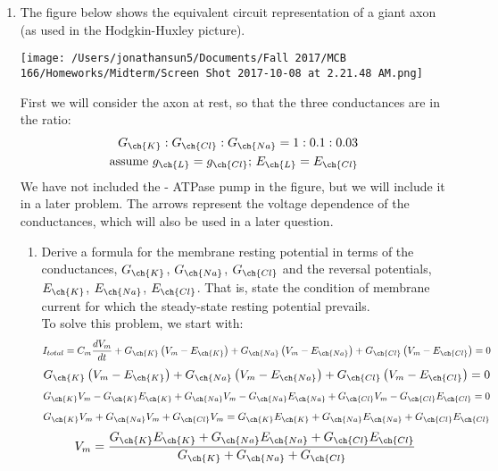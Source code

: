 \documentclass[11pt]{article}
\begin{document}
\begin{enumerate}[label=\arabic*.]
\newpage
\item
The figure below shows the equivalent circuit representation of a giant axon (as used in the Hodgkin-Huxley picture).
\begin{center}
\texttt{[image: /Users/jonathansun5/Documents/Fall 2017/MCB 166/Homeworks/Midterm/Screen Shot 2017-10-08 at 2.21.48 AM.png]}
\end{center}
First we will consider the axon at rest, so that the three conductances are
in the ratio:
\begin{align*}
G_{\ch{K}} : G_{\ch{Cl}} : G_{\ch{Na}} = 1 : 0.1 : 0.03 \\
\text{assume } g_{\ch{L}} = g_{\ch{Cl}}\text{; } E_{\ch{L}} = E_{\ch{Cl}}
\end{align*}
We have not included the - ATPase pump in the figure, but we will include it in a later problem. The arrows represent the voltage dependence of the conductances, which will also be used in a later question.
\begin{enumerate}[label=\alph*.]
\item
Derive a formula for the membrane resting potential in terms of the conductances, $G_{\ch{K}}$, $G_{\ch{Na}}$, $G_{\ch{Cl}}$ and the reversal potentials, $E_{\ch{K}}$, $E_{\ch{Na}}$, $E_{\ch{Cl}}$. That is, state the condition of membrane current for which the steady-state resting potential prevails.
\vspace*{1\baselineskip}
\\
To solve this problem, we start with:
\begin{align*}
I_{total} = C_m \frac{dV_m} {dt} + G_{\ch{K}} \left(V_m - E_{\ch{K}}\right) + G_{\ch{Na}} \left(V_m - E_{\ch{Na}}\right) + G_{\ch{Cl}} \left(V_m - E_{\ch{Cl}}\right) = 0
\end{align*}
\begin{align*}
G_{\ch{K}} \left(V_m - E_{\ch{K}}\right) + G_{\ch{Na}} \left(V_m - E_{\ch{Na}}\right) + G_{\ch{Cl}} \left(V_m - E_{\ch{Cl}}\right) = 0
\end{align*}
\begin{align*}
G_{\ch{K}} V_m - G_{\ch{K}} E_{\ch{K}} + G_{\ch{Na}} V_m - G_{\ch{Na}} E_{\ch{Na}} + G_{\ch{Cl}} V_m - G_{\ch{Cl}} E_{\ch{Cl}} = 0
\end{align*}
\begin{align*}
G_{\ch{K}} V_m + G_{\ch{Na}} V_m + G_{\ch{Cl}} V_m = G_{\ch{K}} E_{\ch{K}} + G_{\ch{Na}} E_{\ch{Na}} + G_{\ch{Cl}} E_{\ch{Cl}}
\end{align*}
\begin{align*}
V_m = \frac{G_{\ch{K}} E_{\ch{K}} + G_{\ch{Na}} E_{\ch{Na}} + G_{\ch{Cl}} E_{\ch{Cl}}} {G_{\ch{K}} + G_{\ch{Na}} + G_{\ch{Cl}}}
\end{align*}




\end{enumerate}
\end{enumerate}
\end{document}
